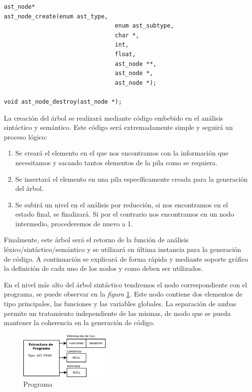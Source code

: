 \documentclass[a4paper,10pt]{article}
\begin{document}
\begin{lstlisting}
ast_node* 
ast_node_create(enum ast_type,
								enum ast_subtype,
								char *,
								int,
								float,
								ast_node **,
								ast_node *,
								ast_node *);
								
void ast_node_destroy(ast_node *);
\end{lstlisting}

La creación del árbol se realizará mediante código embebido en el análisis sintáctico y semántico. Este código será extremadamente simple y seguirá un proceso lógico:

\begin{enumerate}
\item Se creará el elemento en el que nos encontramos con la información que necesitamos y sacando tantos elementos de la pila como se requiera.
\item Se insertará el elemento en una pila específicamente creada para la generación del árbol.
\item Se subirá un nivel en el análisis por reducción, si nos encontramos en el estado final, se finalizará. Si por el contrario nos encontramos en un nodo intermedio, procederemos de nuevo a 1.
\end{enumerate}

Finalmente, este árbol será el retorno de la función de análisis léxico/sintáctico/semántico y se utilizará en última instancia para la generación de código. A continuación se explicará de forma rápida y mediante soporte gráfico la definición de cada uno de los nodos y como deben ser utilizados.

En el nivel más alto del árbol sintáctico tendremos el nodo correspondiente con el programa, se puede observar en la \emph{figura} \ref{fig:prog}. Este nodo contiene dos elementos de tipo principales, las funciones y las variables globales. La separación de ambas permite un tratamiento independiente de las mismas, de modo que se pueda mantener la coherencia en la generación de código.

\begin{figure}[H]
  \centering
  \includegraphics[width=0.40\textwidth]{images/ast_prog.pdf}
  \caption{Programa}
  \label{fig:prog}
\end{figure}
\end{document}

